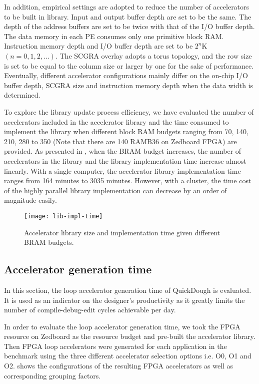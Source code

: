 In addition, empirical settings are adopted to reduce the number of accelerators to be built in
library. Input and output buffer depth are set to be the same. The depth of the address buffers are
set to be twice with that of the I/O buffer depth. The data memory in each PE consumes only one
primitive block RAM. Instruction memory depth and I/O buffer depth are set to be $2^n$K $(n=0,1,2,
...)$. The SCGRA overlay adopts a torus topology, and the row size is set to be equal
to the column size or larger by one for the sake of performance. Eventually, different accelerator
configurations mainly differ on the on-chip I/O buffer depth, SCGRA size and instruction memory depth
when the data width is determined. 

To explore the library update process efficiency, we have evaluated the number of accelerators included in
the accelerator library and the time consumed to implement the library when different block RAM
budgets ranging from 70, 140, 210, 280 to 350 (Note that there are 140 RAMB36 on Zedboard FPGA) are
provided. As presented in , when the BRAM budget increases, the number of accelerators
in the library and the library implementation time increase almost linearly. With a single
computer, the accelerator library implementation time ranges from 164 minutes to 3035 minutes.
However, with a cluster, the time cost of the highly parallel library implementation can decrease by
an order of magnitude easily.
\begin{figure}
\centering
\texttt{[image: lib-impl-time]}
\caption{Accelerator library size and implementation time given different BRAM budgets.}
\label{fig:lib-impl-time}
\vspace{-1em}
\end{figure}

\subsection{Accelerator generation time} \label{subsec:acc-gen}
In this section, the loop accelerator generation time of QuickDough is evaluated. 
It is used as an indicator on the designer's productivity as it greatly limits 
the number of compile-debug-edit cycles achievable per day. 

In order to evaluate the loop accelerator generation time, we took the FPGA resource on Zedboard as
the resource budget and pre-built the accelerator library.
Then FPGA loop accelerators were generated for each application in the benchmark using the three
different accelerator selection options i.e. O0, O1 and O2.  
 shows the configurations of the resulting
FPGA accelerators as well as corresponding grouping factors. 

